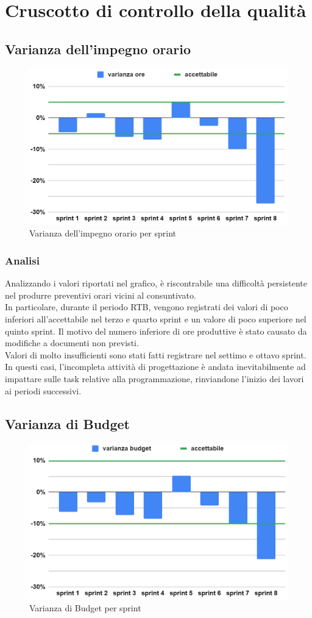 \chapter{Cruscotto di controllo della qualità} \label{sec:cruscotto}

\section{Varianza dell'impegno orario}
\begin{figure}[H]
    \centering
    \includegraphics[width=0.8\linewidth]{VarOre.png}
    \caption{Varianza dell'impegno orario per sprint}
\end{figure}
\subsection{Analisi}
Analizzando i valori riportati nel grafico, è riscontrabile una difficoltà persistente nel produrre preventivi orari vicini al consuntivato.\\
In particolare, durante il periodo RTB, vengono registrati dei valori di poco inferiori all'accettabile nel terzo e quarto sprint e un valore di poco superiore nel quinto sprint. Il motivo del numero inferiore di ore produttive è stato causato da modifiche a documenti non previsti.\\
Valori di molto insufficienti sono stati fatti registrare nel settimo e ottavo sprint. In questi casi, l'incompleta attività di progettazione è andata inevitabilmente ad impattare sulle task relative alla programmazione, rinviandone l'inizio dei lavori ai periodi successivi.

\section{Varianza di Budget}
\begin{figure}[H]
    \centering
    \includegraphics[width=0.8\linewidth]{VarBud.png}
    \caption{Varianza di Budget per sprint}
\end{figure}
